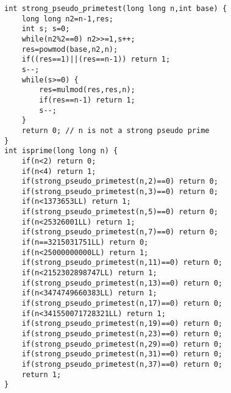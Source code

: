 \begin{lstlisting}
int strong_pseudo_primetest(long long n,int base) {
	long long n2=n-1,res;
	int s; s=0;
	while(n2%2==0) n2>>=1,s++;
	res=powmod(base,n2,n);
	if((res==1)||(res==n-1)) return 1;
	s--;
	while(s>=0) {
		res=mulmod(res,res,n);
		if(res==n-1) return 1;
		s--;
	}
	return 0; // n is not a strong pseudo prime
}
int isprime(long long n) {
	if(n<2) return 0;
	if(n<4) return 1;
	if(strong_pseudo_primetest(n,2)==0) return 0;
	if(strong_pseudo_primetest(n,3)==0) return 0;
	if(n<1373653LL) return 1;
	if(strong_pseudo_primetest(n,5)==0) return 0;
	if(n<25326001LL) return 1;
	if(strong_pseudo_primetest(n,7)==0) return 0;
	if(n==3215031751LL) return 0;
	if(n<25000000000LL) return 1;
	if(strong_pseudo_primetest(n,11)==0) return 0;
	if(n<2152302898747LL) return 1;
	if(strong_pseudo_primetest(n,13)==0) return 0;
	if(n<3474749660383LL) return 1;
	if(strong_pseudo_primetest(n,17)==0) return 0;
	if(n<341550071728321LL) return 1;
	if(strong_pseudo_primetest(n,19)==0) return 0;
	if(strong_pseudo_primetest(n,23)==0) return 0;
	if(strong_pseudo_primetest(n,29)==0) return 0;
	if(strong_pseudo_primetest(n,31)==0) return 0;
	if(strong_pseudo_primetest(n,37)==0) return 0;
	return 1;
}
\end{lstlisting}
